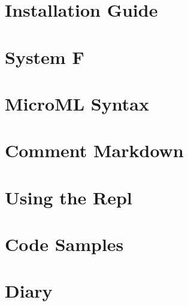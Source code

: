 \documentclass[12pt, a4paper]{report}
\begin{document}
\begin{appendices}
    \chapter{Installation Guide}
    
    \chapter{System F}
    \label{appendix:sysf}
    
    \chapter{MicroML Syntax}
    \label{appendix:syntax}
    
    \chapter{Comment Markdown}
    \label{appendix:md}
    
    \chapter{Using the Repl}
    \label{appendix:repl}
    
    \chapter{Code Samples}
    \label{appendix:samples}
    
    \chapter{Diary}
    \label{appendix:diary}
    
\end{appendices}

\nocite{adams2012layout}
\nocite{9780511608865}
\nocite{Wadler:1995:MFP:647698.734146}
\nocite{958}
\nocite{Steele:1994:BIC:174675.178068}
\nocite{opac-b1081362}
\nocite{cardelli1984basic}

{}

\end{document}
